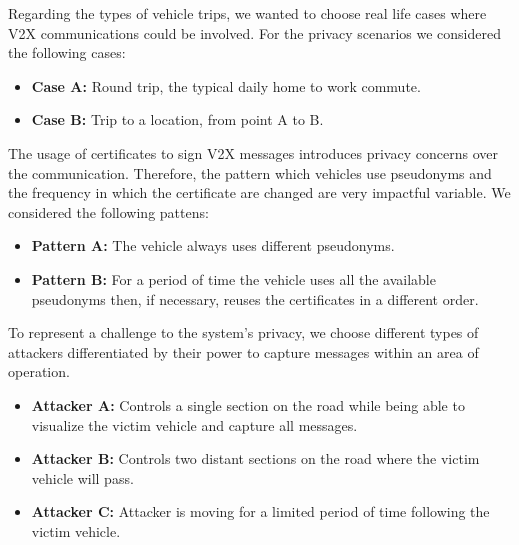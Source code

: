 Regarding the types of vehicle trips, we wanted to choose real life cases where V2X communications could be involved. For the privacy scenarios we considered the following cases:
\begin{itemize}
	\item \textbf{Case A:} Round trip, the typical daily home to work commute.
	\item \textbf{Case B:} Trip to a location, from point A to B.
\end{itemize}


The usage of certificates to sign V2X messages introduces privacy concerns over the communication. Therefore, the pattern which vehicles use pseudonyms and the frequency in which the certificate are changed are very impactful variable. We considered the following pattens:
\begin{itemize}
	\item \textbf{Pattern A:} The vehicle always uses different pseudonyms.
	\item \textbf{Pattern B:} For a period of time the vehicle uses all the available pseudonyms then, if necessary, reuses the certificates in a different order.
\end{itemize}

To represent a challenge to the system's privacy, we choose different types of attackers differentiated by their power to capture messages within an area of operation.
\begin{itemize}
	\item \textbf{Attacker A:} Controls a single section on the road while being able to visualize the victim vehicle and capture all messages.
	\item \textbf{Attacker B:} Controls two distant sections on the road where the victim vehicle will pass.  
	\item \textbf{Attacker C:} Attacker is moving for a limited period of time following the victim vehicle. 
\end{itemize}
	
